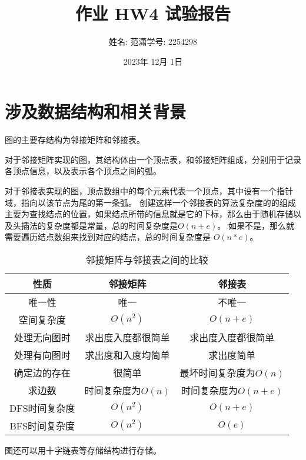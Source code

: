 \documentclass[a4paper,11pt]{article}%
\author{姓名: 范潇\phantom{11}学号: 2254298}
\title{作业 HW4 试验报告}
\date{2023年 12月 1日}
\begin{document}
\lstset{breaklines}%
		\lstset{extendedchars=false}%
\pagestyle{plain}%
\maketitle
\section{涉及数据结构和相关背景}
图的主要存结构为邻接矩阵和邻接表。

对于邻接矩阵实现的图，其结构体由一个顶点表，和邻接矩阵组成，分别用于记录各顶点信息，以及表示各个顶点之间的弧。

对于邻接表实现的图，顶点数组中的每个元素代表一个顶点，其中设有一个指针域，指向以该节点为尾的第一条弧。
创建这样一个邻接表的算法复杂度的的组成主要为查找结点的位置，如果结点所带的信息就是它的下标，那么由于随机存储以及头插法的复杂度都是常量，总的时间复杂度是$O(n+e)$。
如果不是，那么就需要遍历结点数组来找到对应的结点，总的时间复杂度是 $O(n*e)$。

\begin{table}[H]
    \centering
\begin{tabular}[pos]{c|c|c}
    性质&邻接矩阵&邻接表\\
    \hline
    唯一性&唯一&不唯一\\
    空间复杂度&$O(n^2)$&$O(n+e)$\\
    处理无向图时&求出度入度都很简单&求出度入度都很简单\\
    处理有向图时&求出度和入度均简单&求出度简单\\
    确定边的存在&很简单&最坏时间复杂度为$O(n)$\\
    求边数&时间复杂度为$O(n)$&时间复杂度为$O(n+e)$\\
    DFS时间复杂度&$O(n^2)$&$O(n+e)$\\
    BFS时间复杂度&$O(n^2)$&$O(e)$\\
\end{tabular}
\caption{邻接矩阵与邻接表之间的比较}
\end{table}
图还可以用十字链表等存储结构进行存储。
\end{document}
